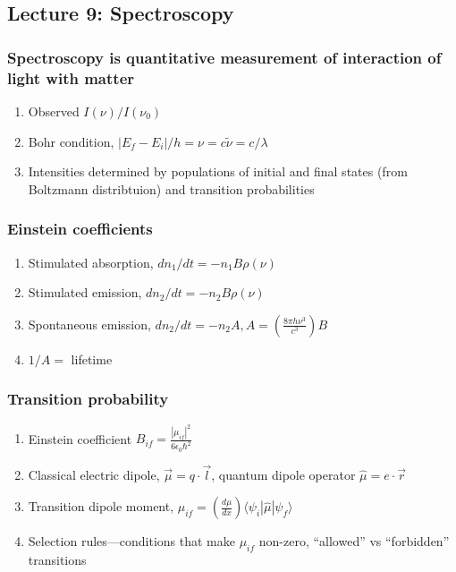 \documentclass[11pt]{article}
\begin{document}
\subsection{Lecture 9: Spectroscopy}
\label{sec:org7712a7e}
\subsubsection{Spectroscopy is quantitative measurement of interaction of light with matter}
\label{sec:org7ffb5f5}
\begin{enumerate}
\item Observed \(I(\nu)/I(\nu_0)\)
\item Bohr condition, \(|E_f-E_i|/h=\nu =c\tilde{\nu}=c/\lambda\)
\item Intensities determined by populations of initial and final states (from Boltzmann distribtuion) and transition probabilities
\end{enumerate}
\subsubsection{Einstein coefficients}
\label{sec:orgb9b1aab}
\begin{enumerate}
\item Stimulated absorption, \(dn_1/dt= -n_1 B\rho(\nu)\)
\item Stimulated emission, \(dn_2/dt= -n_2 B\rho(\nu)\)
\item Spontaneous emission, \(dn_2/dt=-n_2 A, A=\left ( \frac{8\pi h
              \nu^3}{c^3}\right )B\)
\item \(1/A=\) lifetime
\end{enumerate}
\subsubsection{Transition probability}
\label{sec:org4650f13}
\begin{enumerate}
\item Einstein coefficient \(B_{if}=\frac{|\mu_{if}|^2}{6\epsilon_0\hbar^2}\)
\item Classical electric dipole, \(\overrightarrow{\mu}=q \cdot
          \overrightarrow{l}\), quantum dipole operator \(\hat\mu = e\cdot \overrightarrow{r}\)
\item Transition dipole moment, \(\mu_{if} = \left(
        \frac{d\mu}{dx}\right ) \langle \psi_i|\hat\mu |\psi_f \rangle\)
\item Selection rules---conditions that make \(\mu_{if}\) non-zero,
``allowed'' vs ``forbidden'' transitions
\end{enumerate}
\end{document}
